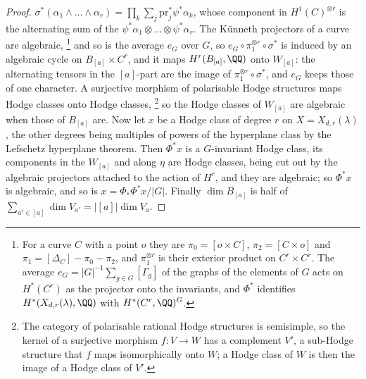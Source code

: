 \begin{proof}
$\sigma^{*}(\alpha_{1}\wedge\dots\wedge\alpha_{r})=\prod_{k}\sum_{j}
\mathrm{pr}_{j}^{*}\psi^{*}\alpha_{k}$, whose component in
$H^{1}(C)^{\otimes r}$ is the alternating sum of the
$\psi^{*}\alpha_{1}\otimes\dots\otimes\psi^{*}\alpha_{r}$. The K\"unneth
projectors of a curve are algebraic,%
\footnote{For a curve $C$ with a point $o$ they are $\pi_{0}=[o\times C]$,
$\pi_{2}=[C\times o]$ and $\pi_{1}=[\Delta_{C}]-\pi_{0}-\pi_{2}$, and
$\pi_{1}^{\otimes r}$ is their exterior product on $C^{r}\times C^{r}$. The
average $e_{G}=|G|^{-1}\sum_{g\in G}[\Gamma_{g}]$ of the graphs of the
elements of $G$ acts on $H^{*}(C^{r})$ as the projector onto the invariants,
and $\Phi^{*}$ identifies $H^{*}(X_{d,r}(\lambda),\QQ)$ with
$H^{*}(C^{r},\QQ)^{G}$.} and so is the average $e_{G}$ over $G$,
so $e_{G}\circ\pi_{1}^{\otimes r}\circ\sigma^{*}$ is induced by an algebraic
cycle on $B_{[a]}\times C^{r}$, and it maps $H^{r}(B_{[a]},\QQ)$ onto
$W_{[a]}$: the alternating tensors in the $[a]$-part are the image of
$\pi_{1}^{\otimes r}\circ\sigma^{*}$, and $e_{G}$ keeps those of one
character. A surjective morphism of polarisable Hodge structures maps Hodge
classes onto Hodge classes,%
\footnote{The category of polarisable rational Hodge structures is semisimple,
so the kernel of a surjective morphism $f\colon V\to W$ has a complement
$V'$, a sub-Hodge structure that $f$ maps isomorphically onto $W$; a Hodge
class of $W$ is then the image of a Hodge class of $V'$.} so the Hodge classes of $W_{[a]}$ are algebraic
when those of $B_{[a]}$ are. Now let $x$ be a Hodge class of degree $r$ on
$X=X_{d,r}(\lambda)$, the other degrees being multiples of powers of the
hyperplane class by the Lefschetz hyperplane theorem. Then $\Phi^{*}x$ is a
$G$-invariant Hodge class, its components in the $W_{[a]}$ and along $\eta$
are Hodge classes, being cut out by the algebraic projectors attached to
the action of $H^{r}$, and they are algebraic; so $\Phi^{*}x$ is algebraic,
and so is $x=\Phi_{*}\Phi^{*}x/|G|$.\enlargethispage{2pt} Finally $\dim B_{[a]}$ is half of
$\sum_{a'\in[a]}\dim V_{a'}=|[a]|\dim V_{a}$.
\end{proof}

